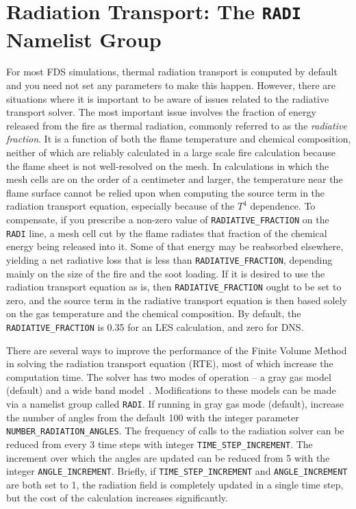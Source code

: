 \documentclass[11pt]{book}
\newcommand{\ct}{\tt\small}
\begin{document}
\section{Radiation Transport: The \texorpdfstring{{\tt RADI}}{RADI} Namelist Group}
\label{info:RADI}

For most FDS simulations, thermal radiation transport is computed by default and you need not set any
parameters to make this happen. However, there are situations where it is important to be aware of
issues related to the radiative transport solver. The most important issue involves the fraction of energy released from the
fire as thermal radiation, commonly referred to as the {\em radiative fraction}. It is a function of both the flame temperature
and chemical composition, neither of which are reliably calculated in a large
scale fire calculation because the flame sheet is not well-resolved on the mesh.
In calculations in which the mesh cells are on the order of a centimeter and
larger, the temperature near the flame surface cannot be relied upon when
computing the source term in the radiation transport equation, especially
because of the $T^4$ dependence.
To compensate, if you prescribe a non-zero
value of {\ct RADIATIVE\_FRACTION} on the {\ct RADI} line, a mesh cell cut by the flame
radiates that fraction of the chemical energy being released into it.
Some of that energy may be reabsorbed elsewhere, yielding a net radiative
loss that is less than {\ct RADIATIVE\_FRACTION}, depending mainly on the size of
the fire and the soot loading. If it is desired to use the radiation transport
equation as is, then {\ct RADIATIVE\_FRACTION} ought to be set to zero,
and the source term in the radiative transport equation is then based solely
on the gas temperature and the chemical composition. By default, the {\ct RADIATIVE\_FRACTION} is
0.35 for an LES calculation, and zero for DNS.

There are several ways to improve the performance of the Finite Volume
Method in solving the radiation transport equation (RTE), most of which
increase the computation time. The solver has two modes of
operation -- a gray gas model (default) and a wide band model~\cite{FDS_Tech_Guide_5}.
Modifications to these models can be made via a namelist group called
{\ct RADI}. If running in gray gas mode (default), increase the number
of angles from the default 100 with the integer parameter
{\ct NUMBER\_RADIATION\_ANGLES}. The frequency of calls to the radiation
solver can be reduced from every 3 time steps with integer
{\ct TIME\_STEP\_INCREMENT}. The increment over which the angles are
updated can be reduced from 5 with the integer {\ct ANGLE\_INCREMENT}.
Briefly, if {\ct TIME\_STEP\_INCREMENT} and {\ct ANGLE\_INCREMENT} are
both set to 1, the radiation field is completely updated in a single
time step, but the cost of the calculation increases significantly.
\end{document}
